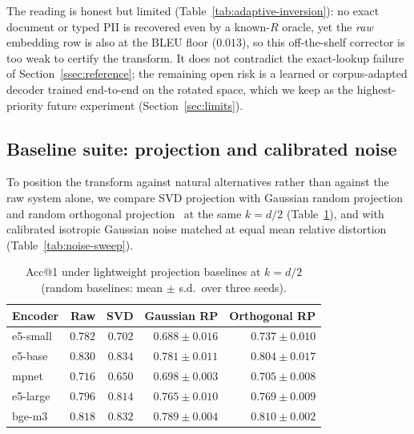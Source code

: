 \documentclass[11pt,a4paper]{article}
\begin{document}
The reading is honest but limited (Table~\ref{tab:adaptive-inversion}): no
exact document or typed PII is recovered even by a known-$R$ oracle, yet
the \emph{raw} embedding row is also at the BLEU floor ($0.013$), so this
off-the-shelf corrector is too weak to certify the transform. It does not
contradict the exact-lookup failure of Section~\ref{ssec:reference}; the
remaining open risk is a learned or corpus-adapted decoder trained
end-to-end on the rotated space, which we keep as the highest-priority
future experiment (Section~\ref{sec:limits}).

\subsection{Baseline suite: projection and calibrated noise}
\label{ssec:baselines}

To position the transform against natural alternatives rather than against
the raw system alone, we compare SVD projection with Gaussian random
projection and random orthogonal projection~\cite{ref_jl} at the same
$k=d/2$ (Table~\ref{tab:projection-baselines}), and with calibrated
isotropic Gaussian noise matched at equal mean relative distortion
(Table~\ref{tab:noise-sweep}).

\begin{table}[tbp]
\centering
\caption{Acc@1 under lightweight projection baselines at $k=d/2$ (random
baselines: mean $\pm$ s.d.\ over three seeds).}
\label{tab:projection-baselines}
\small
\begin{tabular}{@{}lrrrr@{}}
\toprule
Encoder & Raw & SVD & Gaussian RP & Orthogonal RP \\ \midrule
e5-small & $0.782$ & $0.702$ & $0.688 \pm 0.016$ & $0.737 \pm 0.010$ \\
e5-base  & $0.830$ & $0.834$ & $0.781 \pm 0.011$ & $0.804 \pm 0.017$ \\
mpnet    & $0.716$ & $0.650$ & $0.698 \pm 0.003$ & $0.705 \pm 0.008$ \\
e5-large & $0.796$ & $0.814$ & $0.765 \pm 0.010$ & $0.769 \pm 0.009$ \\
bge-m3   & $0.818$ & $0.832$ & $0.789 \pm 0.004$ & $0.810 \pm 0.002$ \\
\bottomrule
\end{tabular}
\end{table}
\end{document}
